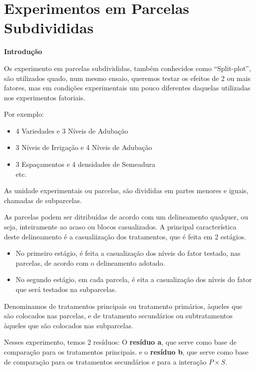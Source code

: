 \documentclass[
]{book}
\providecommand{\tightlist}{%
  \setlength{\itemsep}{0pt}\setlength{\parskip}{0pt}}
\begin{document}
\hypertarget{experimentos-em-parcelas-subdivididas}{%
\chapter{Experimentos em Parcelas Subdivididas}\label{experimentos-em-parcelas-subdivididas}}

\textbf{Introdução}

Os experimento em parcelas subdivididas, também conhecidos como ``Split-plot'', são utilizados quado, num mesmo ensaio, queremos testar os efeitos de 2 ou mais fatores, mas em condições experimentais um pouco diferentes daquelas utilizadas nos experimentos fatoriais.

Por exemplo:

\begin{itemize}
\tightlist
\item
  4 Variedades e 3 Níveis de Adubação\\
\item
  3 Níveis de Irrigação e 4 Níveis de Adubação\\
\item
  3 Espaçamentos e 4 densidades de Semeadura\\
  etc.
\end{itemize}

As unidade experimentais ou parcelas, são divididas em partes menores e iguais, chamadas de subparcelas.

As parcelas podem ser ditribuídas de acordo com um delineamento qualquer, ou seja, inteiramente ao acaso ou blocos casualizados. A principal característica deste delineamento é a casualiização dos tratamentos, que é feita em 2 estágios.

\begin{itemize}
\tightlist
\item
  No primeiro estágio, é feita a casualização dos níveis do fator testado, nas parcelas, de acordo com o delineamento adotado.
\item
  No segundo estágio, em cada parcela, é eita a casualização dos níveis do fator que será testados na subparcelas.
\end{itemize}

Denominamos de tratamentos principais ou tratamento primários, àqueles que são colocados nas parcelas, e de tratamento secundários ou subtratamentos àqueles que são colocados nas subparcelas.

Nesses experimento, temos 2 resíduos: O \textbf{resíduo a}, que serve como base de comparação para os tratamentos principais. e o \textbf{resíduo b}, que serve como base de comparação para os tratamentos secundários e para a interação \(P \times S\).
\end{document}
